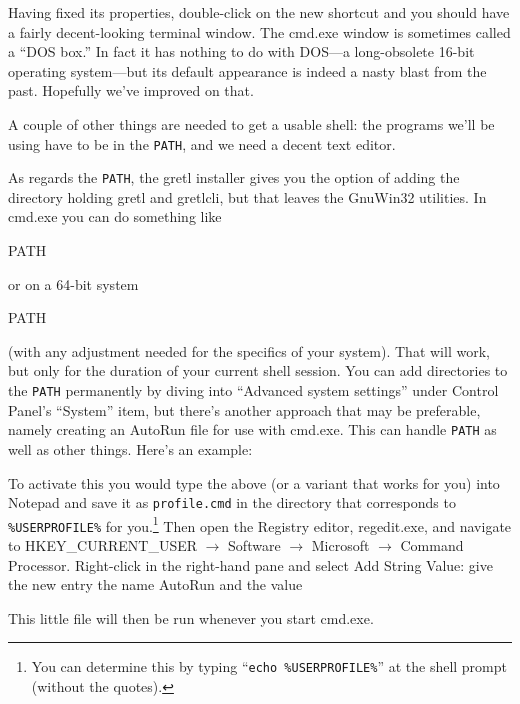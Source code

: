 \documentclass[oneside]{book}
\begin{document}
Having fixed its properties, double-click on the new shortcut and you
should have a fairly decent-looking terminal window. The
\textsf{cmd.exe} window is sometimes called a ``DOS box.''  In fact it
has nothing to do with \textsf{DOS}---a long-obsolete 16-bit operating
system---but its default appearance is indeed a nasty blast from the
past. Hopefully we've improved on that.

A couple of other things are needed to get a usable shell: the
programs we'll be using have to be in the \texttt{PATH}, and we need a
decent text editor.

As regards the \texttt{PATH}, the gretl installer gives you the option
of adding the directory holding \textsf{gretl} and \textsf{gretlcli},
but that leaves the \textsf{GnuWin32} utilities. In \textsf{cmd.exe}
you can do something like
\begin{code}
PATH %
\end{code}
or on a 64-bit system
\begin{code}
PATH %
\end{code}
(with any adjustment needed for the specifics of your system). That
will work, but only for the duration of your current shell session.
You can add directories to the \texttt{PATH} permanently by diving
into ``Advanced system settings'' under Control Panel's ``System''
item, but there's another approach that may be preferable, namely
creating an AutoRun file for use with \textsf{cmd.exe}. This can
handle \texttt{PATH} as well as other things. Here's an example:
%
To activate this you would type the above (or a variant that works for
you) into \textsf{Notepad} and save it as \texttt{profile.cmd} in the
directory that corresponds to \texttt{\%USERPROFILE\%} for
you.\footnote{You can determine this by typing
  ``\verb|echo %USERPROFILE%|'' at the shell prompt (without the
  quotes).}  Then open the Registry editor, \textsf{regedit.exe}, and
navigate to HKEY\_CURRENT\_USER $\rightarrow$ Software $\rightarrow$
Microsoft $\rightarrow$ Command Processor.  Right-click in the
right-hand pane and select Add String Value: give the new entry the
name \textsf{AutoRun} and the value
\begin{code}
\end{code}
This little file will then be run whenever you start \textsf{cmd.exe}.
\end{document}
